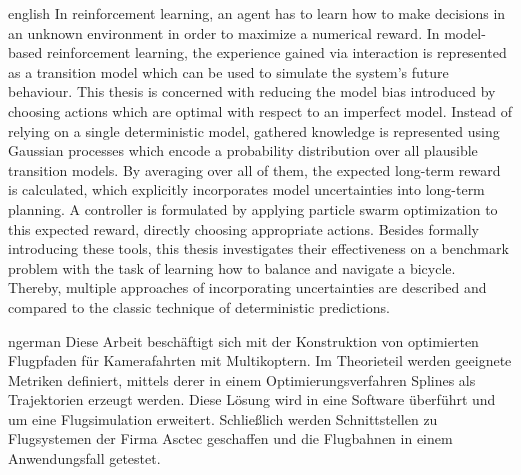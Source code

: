 \begin{Abstract}{english}
In reinforcement learning, an agent has to learn how to make decisions in an unknown environment in order to maximize a numerical reward.
In model-based reinforcement learning, the experience gained via interaction is represented as a transition model which can be used to simulate the system's future behaviour.
This thesis is concerned with reducing the model bias introduced by choosing actions which are optimal with respect to an imperfect model.
Instead of relying on a single deterministic model, gathered knowledge is represented using Gaussian processes which encode a probability distribution over all plausible transition models.
By averaging over all of them, the expected long-term reward is calculated, which explicitly incorporates model uncertainties into long-term planning.
A controller is formulated by applying particle swarm optimization to this expected reward, directly choosing appropriate actions.
Besides formally introducing these tools, this thesis investigates their effectiveness on a benchmark problem with the task of learning how to balance and navigate a bicycle.
Thereby, multiple approaches of incorporating uncertainties are described and compared to the classic technique of deterministic predictions.
\end{Abstract}

\begin{Abstract}{ngerman}
Diese Arbeit beschäftigt sich mit der Konstruktion von optimierten Flugpfaden für Kamerafahrten mit Multikoptern.
Im Theorieteil werden geeignete Metriken definiert, mittels derer in einem Optimierungsverfahren Splines als Trajektorien erzeugt werden.
Diese Lösung wird in eine Software überführt und um eine Flugsimulation erweitert.
Schließlich werden Schnittstellen zu Flugsystemen der Firma Asctec geschaffen und die Flugbahnen in einem Anwendungsfall getestet.
\end{Abstract}
